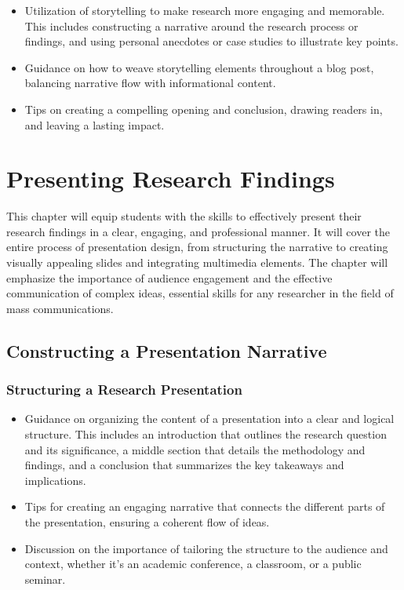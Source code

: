 \documentclass[
]{book}
\begin{document}
\begin{itemize}
\item
  Utilization of storytelling to make research more engaging and memorable. This includes constructing a narrative around the research process or findings, and using personal anecdotes or case studies to illustrate key points.
\item
  Guidance on how to weave storytelling elements throughout a blog post, balancing narrative flow with informational content.
\item
  Tips on creating a compelling opening and conclusion, drawing readers in, and leaving a lasting impact.
\end{itemize}

\hypertarget{presenting-research-findings}{%
\chapter{Presenting Research Findings}\label{presenting-research-findings}}

This chapter will equip students with the skills to effectively present their research findings in a clear, engaging, and professional manner. It will cover the entire process of presentation design, from structuring the narrative to creating visually appealing slides and integrating multimedia elements. The chapter will emphasize the importance of audience engagement and the effective communication of complex ideas, essential skills for any researcher in the field of mass communications.

\hypertarget{constructing-a-presentation-narrative}{%
\section*{Constructing a Presentation Narrative}\label{constructing-a-presentation-narrative}}

\hypertarget{structuring-a-research-presentation}{%
\subsection*{Structuring a Research Presentation}\label{structuring-a-research-presentation}}

\begin{itemize}
\item
  Guidance on organizing the content of a presentation into a clear and logical structure. This includes an introduction that outlines the research question and its significance, a middle section that details the methodology and findings, and a conclusion that summarizes the key takeaways and implications.
\item
  Tips for creating an engaging narrative that connects the different parts of the presentation, ensuring a coherent flow of ideas.
\item
  Discussion on the importance of tailoring the structure to the audience and context, whether it's an academic conference, a classroom, or a public seminar.
\end{itemize}
\end{document}
